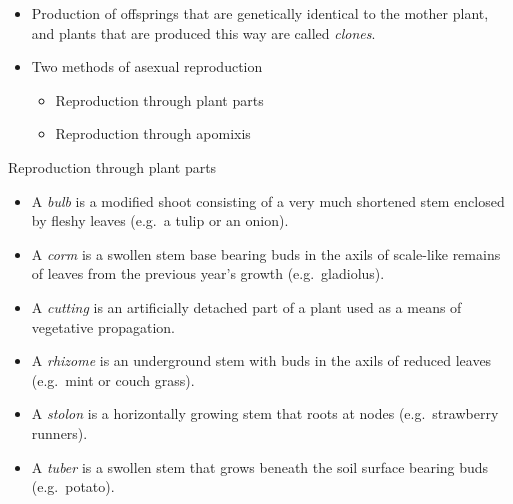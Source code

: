 \documentclass[11pt,ignorenonframetext,aspectratio=169]{beamer}
\providecommand{\tightlist}{%
  \setlength{\itemsep}{0pt}\setlength{\parskip}{0pt}}
\begin{document}
\begin{frame}{}
\protect\hypertarget{section-16}{}
\begin{itemize}
\tightlist
\item
  Production of offsprings that are genetically identical to the mother
  plant, and plants that are produced this way are called \emph{clones}.
\item
  Two methods of asexual reproduction

  \begin{itemize}
  \tightlist
  \item
    Reproduction through plant parts
  \item
    Reproduction through apomixis
  \end{itemize}
\end{itemize}
\end{frame}

\begin{frame}{Reproduction through plant parts}
\protect\hypertarget{reproduction-through-plant-parts}{}
\begin{itemize}
\tightlist
\item
  A \emph{bulb} is a modified shoot consisting of a very much shortened
  stem enclosed by fleshy leaves (e.g.~a tulip or an onion).
\item
  A \emph{corm} is a swollen stem base bearing buds in the axils of
  scale-like remains of leaves from the previous year's growth
  (e.g.~gladiolus).
\item
  A \emph{cutting} is an artificially detached part of a plant used as a
  means of vegetative propagation.
\item
  A \emph{rhizome} is an underground stem with buds in the axils of
  reduced leaves (e.g.~mint or couch grass).
\item
  A \emph{stolon} is a horizontally growing stem that roots at nodes
  (e.g.~strawberry runners).
\item
  A \emph{tuber} is a swollen stem that grows beneath the soil surface
  bearing buds (e.g.~potato).
\end{itemize}
\end{frame}
\end{document}
